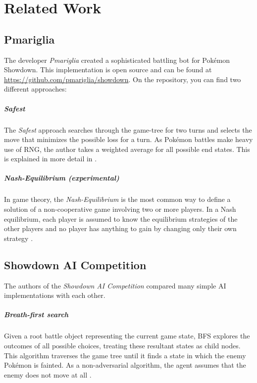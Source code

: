 
\chapter{Related Work}
\label{ch:relatedwork}


\section{Pmariglia}
\label{sec:pmariglia}
The developer \textit{Pmariglia}\cite{Github:pmariglia-showdown} created a sophisticated
battling bot for Pokémon Showdown. This implementation is open source and can be found 
at \url{https://github.com/pmariglia/showdown}. On the repository, you can find two 
different approaches: \\

\paragraph{Safest}
The \textit{Safest} approach searches through the game-tree for two turns and selects the 
move that minimizes the possible loss for a turn. As Pokémon battles make heavy use of
\ac{RNG}, the author takes a weighted average for all possible end states. This is explained
in more detail in .

\paragraph{Nash-Equilibrium (experimental)}
In game theory, the \textit{Nash-Equilibrium} is the most common way to define a solution
of a non-cooperative game involving two or more players.  In a Nash equilibrium, each player 
is assumed to know the equilibrium strategies of the other players and no player has 
anything to gain by changing only their own strategy \cite{wiki:Nash_equilibrium}.

\section{Showdown AI Competition}
The authors of the \textit{Showdown AI Competition}\cite{Lee_Togelius_2017} compared many
simple AI implementations with each other. 
\paragraph{Breath-first search}
\label{sec:showdown-competition-bfs}
Given a root battle object representing the current game state, \ac{BFS} explores the
outcomes of all possible choices, treating these resultant states as child nodes. This
algorithm traverses the game tree until it finds a state in which the enemy Pokémon is
fainted. As a non-adversarial algorithm, the agent assumes that the enemy does not 
move at all \cite{Lee_Togelius_2017}. 


